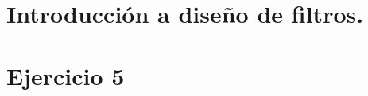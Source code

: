







\tableofcontents
\newpage

\section{Introducción a diseño de filtros.}
	
	\newpage
	
\section{Ejercicio 5}
	
	\newpage
	
	\newpage
	
